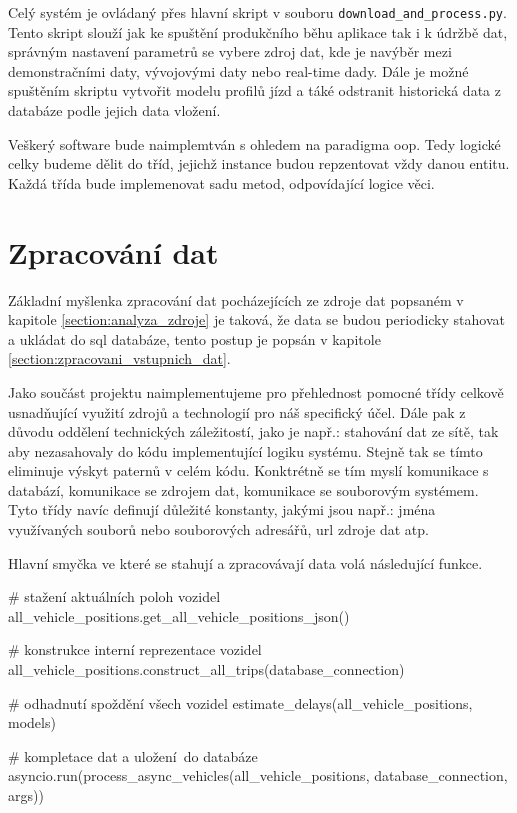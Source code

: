\bigbreak

Celý systém je ovládaný přes hlavní skript v souboru \verb-download_and_process.py-. Tento skript slouží jak ke spuštění produkčního běhu aplikace tak i k údržbě dat, správným nastavení parametrů se vybere zdroj dat, kde je navýběr mezi demonstračními daty, vývojovými daty nebo real-time dady. Dále je možné spuštěním skriptu vytvořit modelu profilů jízd a táké odstranit historická data z databáze podle jejich data vložení.

\bigbreak

Veškerý software bude naimplemtván s ohledem na paradigma \gls{oop}. Tedy logické celky budeme dělit do tříd, jejichž instance budou repzentovat vždy danou entitu. Každá třída bude implemenovat sadu metod, odpovídající logice věci.

\section{Zpracování dat} \label{section:zpracovani_dat}

Základní myšlenka zpracování dat pocházejících ze zdroje dat popsaném v kapitole \ref{section:analyza_zdroje} je taková, že data se budou periodicky stahovat a ukládat do \gls{sql} databáze, tento postup je popsán v kapitole \ref{section:zpracovani_vstupnich_dat}.

\bigbreak

Jako součást projektu naimplementujeme pro přehlednost pomocné třídy celkově usnadňující využití zdrojů a technologií pro náš specifický účel. Dále pak z důvodu oddělení technických záležitostí, jako je např.: stahování dat ze sítě, tak aby nezasahovaly do kódu implementující logiku systému. Stejně tak se tímto eliminuje výskyt paternů v celém kódu. Konktrétně se tím myslí komunikace s databází, komunikace se zdrojem dat, komunikace se souborovým systémem. Tyto třídy navíc definují důležité konstanty, jakými jsou např.: jména využívaných souborů nebo souborových adresářů, \gls{url} zdroje dat atp.

\bigbreak

Hlavní smyčka ve které se stahují a zpracovávají data volá následující funkce.

\begin{code}[frame=none]
# stažení aktuálních poloh vozidel
all_vehicle_positions.get_all_vehicle_positions_json()

# konstrukce interní reprezentace vozidel
all_vehicle_positions.construct_all_trips(database_connection)

# odhadnutí spoždění všech vozidel
estimate_delays(all_vehicle_positions, models)

# kompletace dat a uložení do databáze
asyncio.run(process_async_vehicles(all_vehicle_positions, database_connection, args))
\end{code}

